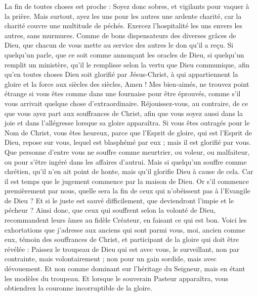 \begin{multicols}{2}
La fin de toutes choses est proche : Soyez donc sobres, et vigilants pour vaquer à la prière.
Mais surtout, ayez les uns pour les autres une ardente charité, car la charité couvre une multitude de péchés.
Exercez l’hospitalité les uns envers les autres, sans murmures.
Comme de bons dispensateurs des diverses grâces de Dieu, que chacun de vous mette au service des autres le don qu'il a reçu.
Si quelqu'un parle, que ce soit comme annonçant les oracles de Dieu, si quelqu'un remplit un ministère, qu'il le remplisse selon la vertu que Dieu communique, afin qu'en toutes choses Dieu soit glorifié par Jésus-Christ, à qui appartiennent la gloire et la force aux siècles des siècles, Amen !
Mes bien-aimés, ne trouvez point étrange si vous êtes comme dans une fournaise pour être éprouvés, comme s’il vous arrivait quelque chose d'extraordinaire.
Réjouissez-vous, au contraire, de ce que vous ayez part aux souffrances de Christ, afin que vous soyez aussi dans la joie et dans l’allégresse lorsque sa gloire apparaîtra.
Si vous êtes outragés pour le Nom de Christ, vous êtes heureux, parce que l'Esprit de gloire, qui est l’Esprit de Dieu, repose sur vous, lequel est blasphémé par eux ; mais il est glorifié par vous.
Que personne d’entre vous ne souffre comme meurtrier, ou voleur, ou malfaiteur, ou pour s’être ingéré dans les affaires d'autrui.
Mais si quelqu'un souffre comme chrétien, qu'il n'en ait point de honte, mais qu'il glorifie Dieu à cause de cela.
Car il est temps que le jugement commence par la maison de Dieu. Or s'il commence premièrement par nous, quelle sera la fin de ceux qui n'obéissent pas à l'Evangile de Dieu ?
Et si le juste est sauvé difficilement, que deviendront l’impie et le pécheur ?
Ainsi donc, que ceux qui souffrent selon la volonté de Dieu, recommandent leurs âmes au fidèle Créateur, en faisant ce qui est bon.
\VerseOne{}Voici les exhortations que j’adresse aux anciens qui sont parmi vous, moi, ancien comme eux, témoin des souffrances de Christ, et participant de la gloire qui doit être révélée :
Paissez le troupeau de Dieu qui est avec vous, le surveillant, non par contrainte, mais volontairement ; non pour un gain sordide, mais avec dévouement.
Et non comme dominant sur l’héritage du Seigneur, mais en étant les modèles du troupeau.
Et lorsque le souverain Pasteur apparaîtra, vous obtiendrez la couronne incorruptible de la gloire.

\end{multicols}
